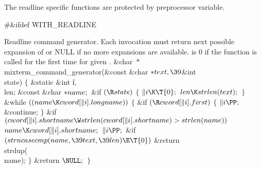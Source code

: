 The readline specific functions are protected by 
preprocessor
variable.

\Y\B\8\#\&{ifdef} \.{WITH\_READLINE}\par
\fi

Readline command generator. Each invocation must return next possible
expansion of  or {\mc NULL} if no more expansions are available.
 is 0 if the function is called for the first time for given .
\Y\B\&{char} ${}{*}{}$\\{mixterm\_command\_generator}(\&{const} \&{char} ${}{*}%
\\{text},\39{}$\&{int} \\{state})\1\1\2\2\6
${}\{{}$\1\6
\&{static} \&{int} \|i${},{}$ \\{len};\6
\&{const} \&{char} ${}{*}\\{name};{}$\7
\&{if} ${}(\R\\{state}){}$\5
${}\{{}$\1\6
${}\|i\K\T{0};{}$\6
${}\\{len}\K\\{strlen}(\\{text});{}$\6
\4${}\}{}$\2\6
\&{while} ${}((\\{name}\K\\{cword}[\|i].\\{longname})){}$\5
${}\{{}$\1\6
\&{if} ${}(\R\\{cword}[\|i].\\{first}){}$\5
${}\{{}$\1\6
${}\|i\PP;{}$\6
\&{continue};\6
\4${}\}{}$\2\6
\&{if} ${}(\\{cword}[\|i].\\{shortname}\W\\{strlen}(\\{cword}[\|i].%
\\{shortname})>\\{strlen}(\\{name})){}$\1\5
${}\\{name}\K\\{cword}[\|i].\\{shortname};{}$\2\6
${}\|i\PP;{}$\6
\&{if} ${}(\\{strncasecmp}(\\{name},\39\\{text},\39\\{len})\E\T{0}){}$\1\5
\&{return} \\{strdup}(\\{name});\2\6
\4${}\}{}$\2\6
\&{return} ${}\NULL;{}$\6
\4${}\}{}$\2\par
\fi

